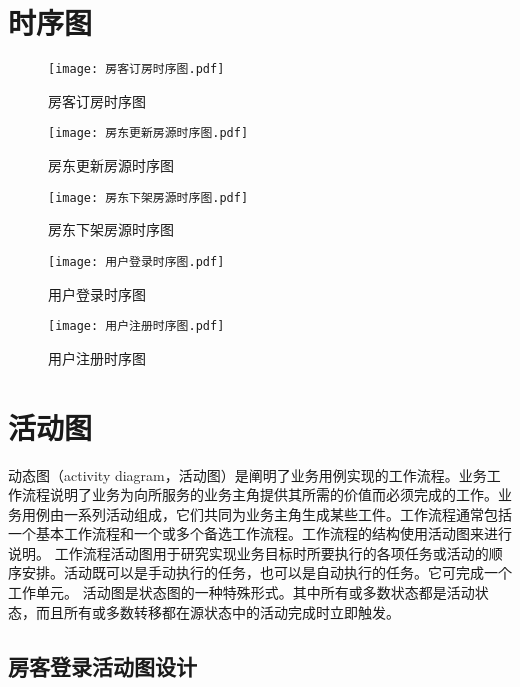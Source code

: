 \documentclass[lang=cn,11pt,a4paper,cite=authoryear]{elegantpaper}
\begin{document}
\section{时序图}

\begin{figure}[]
    \centering
    \texttt{[image: 房客订房时序图.pdf]}
    \caption{房客订房时序图}
    \label{fig:房客订房时序图}
\end{figure}

\begin{figure}[]
    \centering
    \texttt{[image: 房东更新房源时序图.pdf]}
    \caption{房东更新房源时序图}
    \label{fig:房东更新房源时序图}
\end{figure}

\begin{figure}[]
    \centering
    \texttt{[image: 房东下架房源时序图.pdf]}
    \caption{房东下架房源时序图}
    \label{fig:房东下架房源时序图}
\end{figure}

\begin{figure}[]
    \centering
    \texttt{[image: 用户登录时序图.pdf]}
    \caption{用户登录时序图}
    \label{fig:用户登录时序图}
\end{figure}

\begin{figure}[]
    \centering
    \texttt{[image: 用户注册时序图.pdf]}
    \caption{用户注册时序图}
    \label{fig:用户注册时序图}
\end{figure}


\section{活动图}

动态图（activity diagram，活动图）是阐明了业务用例实现的工作流程。业务工作流程说明了业务为向所服务的业务主角提供其所需的价值而必须完成的工作。业务用例由一系列活动组成，它们共同为业务主角生成某些工件。工作流程通常包括一个基本工作流程和一个或多个备选工作流程。工作流程的结构使用活动图来进行说明。
工作流程活动图用于研究实现业务目标时所要执行的各项任务或活动的顺序安排。活动既可以是手动执行的任务，也可以是自动执行的任务。它可完成一个工作单元。 
活动图是状态图的一种特殊形式。其中所有或多数状态都是活动状态，而且所有或多数转移都在源状态中的活动完成时立即触发。

\subsection{房客登录活动图设计}
\end{document}

